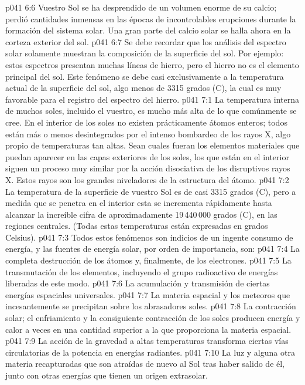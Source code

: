 \vs p041 6:6 \pc Vuestro Sol se ha desprendido de un volumen enorme de su calcio; perdió cantidades inmensas en las épocas de incontrolables erupciones durante la formación del sistema solar. Una gran parte del calcio solar se halla ahora en la corteza exterior del sol.
\vs p041 6:7 \pc Se debe recordar que los análisis del espectro solar solamente muestran la composición de la superficie del sol. Por ejemplo: estos espectros presentan muchas líneas de hierro, pero el hierro no es el elemento principal del sol. Este fenómeno se debe casi exclusivamente a la temperatura actual de la superficie del sol, algo menos de 3315 grados (C), la cual es muy favorable para el registro del espectro del hierro.
\vs p041 7:1 La temperatura interna de muchos soles, incluido el vuestro, es mucho más alta de lo que comúnmente se cree. En el interior de los soles no existen prácticamente átomos enteros; todos están más o menos desintegrados por el intenso bombardeo de los rayos X, algo propio de temperaturas tan altas. Sean cuales fueran los elementos materiales que puedan aparecer en las capas exteriores de los soles, los que están en el interior siguen un proceso muy similar por la acción disociativa de los disruptivos rayos X. Estos rayos son los grandes niveladores de la estructura del átomo.
\vs p041 7:2 La temperatura de la superficie de vuestro Sol es de casi 3315 grados (C), pero a medida que se penetra en el interior esta se incrementa rápidamente hasta alcanzar la increíble cifra de aproximadamente 19\,440\,000 grados (C), en las regiones centrales. (Todas estas temperaturas están expresadas en grados Celsius).
\vs p041 7:3 \pc Todos estos fenómenos son indicios de un ingente consumo de energía, y las fuentes de energía solar, por orden de importancia, son:
\vs p041 7:4 La completa destrucción de los átomos y, finalmente, de los electrones.
\vs p041 7:5 La transmutación de los elementos, incluyendo el grupo radioactivo de energías liberadas de este modo.
\vs p041 7:6 La acumulación y transmisión de ciertas energías espaciales universales.
\vs p041 7:7 La materia espacial y los meteoros que incesantemente se precipitan sobre los abrasadores soles.
\vs p041 7:8 La contracción solar; el enfriamiento y la consiguiente contracción de los soles producen energía y calor a veces en una cantidad superior a la que proporciona la materia espacial.
\vs p041 7:9 La acción de la gravedad a altas temperaturas transforma ciertas vías circulatorias de la potencia en energías radiantes.
\vs p041 7:10 La luz y alguna otra materia recapturadas que son atraídas de nuevo al Sol tras haber salido de él, junto con otras energías que tienen un origen extrasolar.
